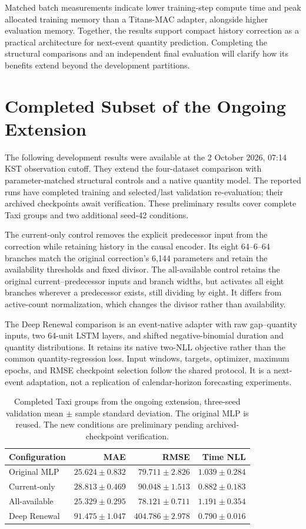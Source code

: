 \documentclass[runningheads]{llncs}
\begin{document}
Matched batch measurements indicate lower training-step compute time and
peak allocated training memory than a Titans-MAC adapter, alongside higher
evaluation memory. Together, the results support compact history correction
as a practical architecture for next-event quantity prediction. Completing
the structural comparisons and an independent final evaluation will clarify
how its benefits extend beyond the development partitions.

\appendix
\section{Completed Subset of the Ongoing Extension}\label{app:extension}
The following development results were available at the 2 October 2026,
07:14 KST observation cutoff. They extend the four-dataset comparison with
parameter-matched structural controls and a native quantity model. The
reported runs have completed training and selected/last validation
re-evaluation; their archived checkpoints await verification. These
preliminary results cover complete Taxi groups and two additional seed-42
conditions.

The current-only control removes the explicit predecessor input from the
correction while retaining history in the causal encoder. Its eight
64--6--64 branches match the original correction's 6,144 parameters and
retain the availability thresholds and fixed divisor. The all-available
control retains the original current--predecessor inputs and branch widths,
but activates all eight branches wherever a predecessor exists, still
dividing by eight. It differs from active-count normalization, which changes
the divisor rather than availability.

The Deep Renewal comparison is an event-native adapter with raw gap--quantity
inputs, two 64-unit LSTM layers, and shifted negative-binomial duration and
quantity distributions. It retains its native two-NLL objective rather than
the common quantity-regression loss. Input windows, targets, optimizer,
maximum epochs, and RMSE checkpoint selection follow the shared protocol.
It is a next-event adaptation, not a replication of calendar-horizon
forecasting experiments.

\begin{table}[h]
\caption{Completed Taxi groups from the ongoing extension, three-seed
validation mean $\pm$ sample standard deviation. The original MLP is reused.
The new conditions are preliminary pending archived-checkpoint verification.}
\label{tab:extension}\centering\small
\begin{tabular}{lrrr}
\toprule
Configuration & MAE & RMSE & Time NLL\\
\midrule
Original MLP & $25.624\pm0.832$ & $79.711\pm2.826$ & $1.039\pm0.284$\\
Current-only & $28.813\pm0.469$ & $90.048\pm1.513$ & $0.882\pm0.183$\\
All-available & $25.329\pm0.295$ & $78.121\pm0.711$ & $1.191\pm0.354$\\
Deep Renewal & $91.475\pm1.047$ & $404.786\pm2.978$ & $0.790\pm0.016$\\
\bottomrule
\end{tabular}
\end{table}
\end{document}
